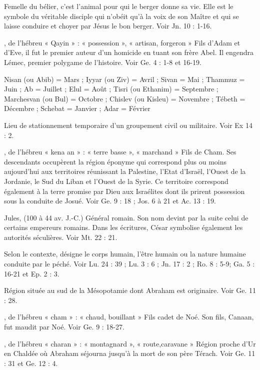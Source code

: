 \begin{multicols}{2}
Femelle du bélier, c’est l'animal pour qui le berger donne sa vie. Elle est le symbole du véritable disciple qui n’obéit qu’à la voix de son Maître et qui se laisse conduire et choyer par Jésus le bon berger. Voir Jn. 10 : 1-16.

, de l'hébreu « Qayin » : « possession », « artisan, forgeron »
Fils d'Adam et d'Eve, il fut le premier auteur d’un homicide en tuant son frère Abel. Il engendra Lémec, premier polygame de l'histoire. Voir Ge. 4 : 1-8 et 16-19.

Nisan (ou Abib) = Mars ; Iyyar (ou Ziv) = Avril ; Sivan = Mai ; Thammuz = Juin ; Ab = Juillet ; Elul = Août ; Tisri (ou Ethanim) = Septembre ; Marchesvan (ou Bul) = Octobre ; Chislev (ou Kisleu) = Novembre ; Tébeth = Décembre ; Schebat = Janvier ; Adar = Février

Lieu de stationnement temporaire d’un groupement civil ou militaire. Voir Ex 14 : 2.

, de l'hébreu « kena an » : « terre basse », « marchand »
Fils de Cham. Ses descendants occupèrent la région éponyme qui correspond plus ou moins aujourd'hui aux territoires réunissant la Palestine, l'Etat d'Israël, l'Ouest de la Jordanie, le Sud du Liban et l'Ouest de la Syrie. Ce territoire correspond également à la terre promise par Dieu aux Israélites dont ils prirent possession sous la conduite de Josué. Voir Ge. 9 : 18 ; Jos. 6 à 21 et Ac. 13 : 19.

Jules, (100 à 44 av. J.-C.)
Général romain. Son nom devint par la suite celui de certains empereurs romains. Dans les écritures, César symbolise également les autorités séculières. Voir Mt. 22 : 21.

Selon le contexte, désigne le corps humain, l'être humain ou la nature humaine conduite par le péché. Voir Lu. 24 : 39 ; Lu. 3 : 6 ; Jn. 17 : 2 ; Ro. 8 : 5-9; Ga. 5 : 16-21 et Ep. 2 : 3.

Région située au sud de la Mésopotamie dont Abraham est originaire. Voir Ge. 11 : 28.

, de l’hébreu « cham » : « chaud, bouillant »
Fils cadet de Noé. Son fils, Canaan, fut maudit par Noé. Voir Ge. 9 : 18-27.

, de l’hébreu « charan » : « montagnard », « route,caravane »
Région proche d'Ur en Chaldée où Abraham séjourna jusqu'à la mort de son père Térach. Voir Ge. 11 : 31 et Ge. 12 : 4.


\end{multicols}
